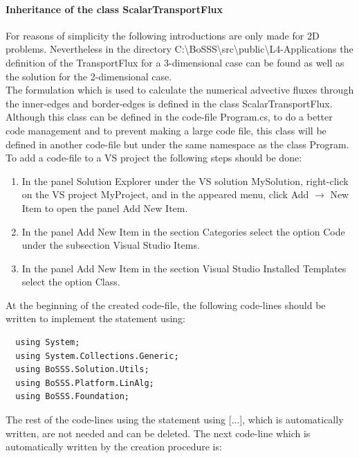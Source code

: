 \documentclass[11pt,twoside,a4paper]{fdyartcl}
\begin{document}
{{\paragraph{Inheritance of the class {\scriptsize ScalarTransportFlux}}
For reasons of simplicity the following introductions are only made for 2D problems. Nevertheless in the directory {\scriptsize C:\textbackslash BoSSS\textbackslash src\textbackslash public\textbackslash L4-Applications} the definition of the TransportFlux for a 3-dimensional case can be found as well as the solution for the 2-dimensional case. \\
The formulation which is used to calculate the numerical advective fluxes through the inner-edges and border-edges is defined in the class {\scriptsize ScalarTransportFlux}. Although this class can be defined in the code-file {\scriptsize Program.cs}, to do a better code management and to prevent making a large code file, this class will be defined in another code-file but under the same namespace as the class {\scriptsize Program}. To add a code-file to a VS project the following steps should be done:
\begin{enumerate}
\item In the panel {\scriptsize Solution Explorer} under the VS solution {\scriptsize MySolution}, right-click on the VS project {\scriptsize MyProject}, and in the appeared menu, click {\scriptsize Add $\rightarrow$ New Item} to open the panel {\scriptsize Add New Item}.
\item In the panel {\scriptsize Add New Item} in the section {\scriptsize Categories} select the option {\scriptsize Code} under the subsection {\scriptsize Visual Studio Items}.
\item In the panel {\scriptsize Add New Item} in the section {\scriptsize Visual Studio Installed Templates} select the option {\scriptsize Class}.
\end{enumerate}
At the beginning of the created code-file, the following code-lines should be written to implement the statement {\scriptsize using}:
{\scriptsize \begin{verbatim}
  using System;
  using System.Collections.Generic;
  using BoSSS.Solution.Utils;
  using BoSSS.Platform.LinAlg;
  using BoSSS.Foundation;
\end{verbatim}}
The rest of the code-lines using the statement {\scriptsize using [...]}, which is automatically written, are not needed and can be deleted. The next code-line which is automatically written by the creation procedure is:
{\scriptsize \begin{verbatim}

\end{verbatim}}}}
\end{document}
